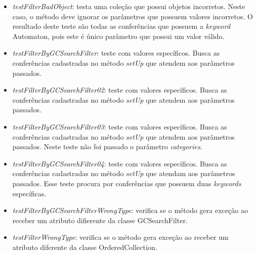 \begin{itemize}
\item \textit{testFilterBadObject}: testa uma coleção que possui objetos incorretos. Neste caso, o método deve ignorar os parâmetros que possuem valores incorretos. O resultado deste teste são todas as conferências que possuem a \textit{keyword} Automaton, pois este é único parâmetro que possui um valor válido.
\item \textit{testFilterByGCSearchFilter}: teste com valores específicos. Busca as conferências cadastradas no método \textit{setUp} que atendem aos parâmetros passados.
\item \textit{testFilterByGCSearchFilter02}: teste com valores específicos. Busca as conferências cadastradas no método \textit{setUp} que atendem aos parâmetros passados.
\item \textit{testFilterByGCSearchFilter03}: teste com valores específicos. Busca as conferências cadastradas no método \textit{setUp} que atendem aos parâmetros passados. Neste teste não foi passado o parâmetro \textit{categories}.
\item \textit{testFilterByGCSearchFilter04}: teste com valores específicos. Busca as conferências cadastradas no método \textit{setUp} que atendam aos parâmetros passados. Esse teste procura por conferências que possuem duas \textit{keywords} específicas.
\item \textit{testFilterByGCSearchFilterWrongType}: verifica se o método gera exceção ao receber um atributo difierente da classe GCSearchFilter.
\item \textit{testFilterWrongType}: verifica se o método gera exceção ao receber um atributo diferente da classe OrderedCollection.
\end{itemize}